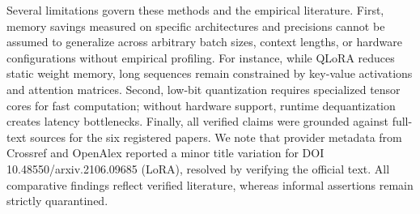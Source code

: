 \documentclass[11pt,a4paper]{article}
\begin{document}
Several limitations govern these methods and the empirical literature. First, memory savings measured on specific architectures and precisions cannot be assumed to generalize across arbitrary batch sizes, context lengths, or hardware configurations without empirical profiling. For instance, while QLoRA reduces static weight memory, long sequences remain constrained by key-value activations and attention matrices. Second, low-bit quantization requires specialized tensor cores for fast computation; without hardware support, runtime dequantization creates latency bottlenecks. Finally, all verified claims were grounded against full-text sources for the six registered papers. We note that provider metadata from Crossref and OpenAlex reported a minor title variation for DOI 10.48550/arxiv.2106.09685 (LoRA), resolved by verifying the official text. All comparative findings reflect verified literature, whereas informal assertions remain strictly quarantined.



\end{document}
